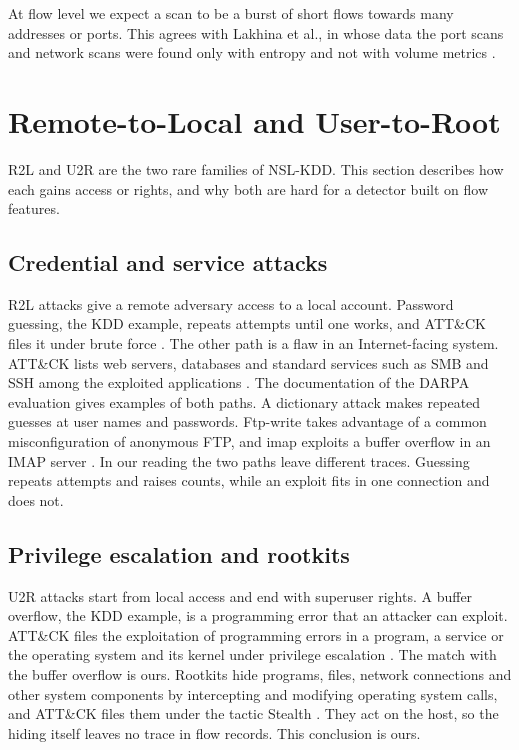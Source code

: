 At flow level we expect a scan to be a burst of short flows towards many
addresses or ports. This agrees with Lakhina et al., in whose data
the port scans and network scans were found only with entropy and not with
volume metrics \citep{lakhina2005mining}.

\section{Remote-to-Local and User-to-Root}
\label{sec:r2l-u2r}

R2L and U2R are the two rare families of NSL-KDD. This section describes how each gains
access or rights, and why both are hard for a detector built on flow features.

\subsection{Credential and service attacks}
\label{sec:credential-attacks}

R2L attacks give a remote adversary access to a local account. Password
guessing, the KDD example, repeats attempts until one works, and ATT\&CK
files it under brute force \citep{mitre2026t1110}. The other path is a flaw in
an Internet-facing system. ATT\&CK lists web servers, databases and standard
services such as SMB and SSH among the exploited applications
\citep{mitre2026t1190}. The documentation of the DARPA evaluation gives
examples of both paths. A dictionary attack makes repeated guesses at user
names and passwords. Ftp-write takes advantage of a common misconfiguration
of anonymous FTP, and imap exploits a buffer overflow in an IMAP server
\citep{mitll1998attacks}. In our reading the two paths leave different traces.
Guessing repeats attempts and raises counts, while an exploit fits in one
connection and does not.

\subsection{Privilege escalation and rootkits}
\label{sec:privilege-escalation}

U2R attacks start from local access and end with superuser rights. A buffer
overflow, the KDD example, is a programming error that an attacker can
exploit. ATT\&CK files the exploitation of programming errors in a program, a
service or the operating system and its kernel under privilege escalation
\citep{mitre2025t1068}. The match with the buffer overflow is ours. Rootkits
hide programs, files, network connections and other system components by
intercepting and modifying operating system calls, and ATT\&CK files them
under the tactic Stealth \citep{mitre2026t1014}. They act on the host, so the
hiding itself leaves no trace in flow records. This conclusion is ours.

